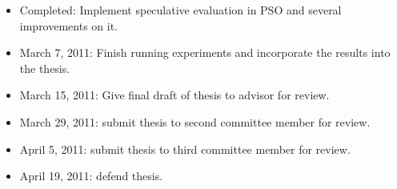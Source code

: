 \documentclass[ms]{byuprop}
\begin{document}
\begin{itemize}

\item Completed: Implement speculative evaluation in PSO and several
  improvements on it.

\item March 7, 2011: Finish running experiments and incorporate the results
  into the thesis.
  
\item March 15, 2011: Give final draft of thesis to advisor for review.

\item March 29, 2011: submit thesis to second committee member for review.

\item April 5, 2011: submit thesis to third committee member for review.

\item April 19, 2011: defend thesis.

\end{itemize}



\renewcommand\bibsection{\section{Annotated Bibliography}}


\end{document}
